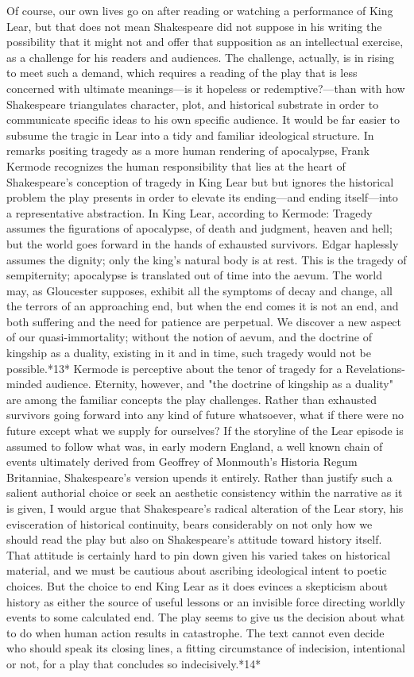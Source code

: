 	Of course, our own lives go on after reading or watching a performance of King Lear, but that does not mean Shakespeare did not suppose in his writing the possibility that it might not and offer that supposition as an intellectual exercise, as a challenge for his readers and audiences. The challenge, actually, is in rising to meet such a demand, which requires a reading of the play that is less concerned with ultimate meanings—is it hopeless or redemptive?—than with how Shakespeare triangulates character, plot, and historical substrate in order to communicate specific ideas to his own specific audience. It would be far easier to subsume the tragic in Lear into a tidy and familiar ideological structure. In remarks positing tragedy as a more human rendering of apocalypse, Frank Kermode recognizes the human responsibility that lies at the heart of Shakespeare's conception of tragedy in King Lear but but ignores the historical problem the play presents in order to elevate its ending—and ending itself—into a representative abstraction. In King Lear, according to Kermode:
Tragedy assumes the figurations of apocalypse, of death and judgment, heaven and hell; but the world goes forward in the hands of exhausted survivors. Edgar haplessly assumes the dignity; only the king's natural body is at rest. This is the tragedy of sempiternity; apocalypse is translated out of time into the aevum. The world may, as Gloucester supposes, exhibit all the symptoms of decay and change, all the terrors of an approaching end, but when the end comes it is not an end, and both suffering and the need for patience are perpetual. We discover a new aspect of our quasi-immortality; without the notion of aevum, and the doctrine of kingship as a duality, existing in it and in time, such tragedy would not be possible.*13*
Kermode is perceptive about the tenor of tragedy for a Revelations-minded audience. Eternity, however, and "the doctrine of kingship as a duality" are among the familiar concepts the play challenges. Rather than exhausted survivors going forward into any kind of future whatsoever, what if there were no future except what we supply for ourselves? If the storyline of the Lear episode is assumed to follow what was, in early modern England, a well known chain of events ultimately derived from Geoffrey of Monmouth's Historia Regum Britanniae, Shakespeare's version upends it entirely. Rather than justify such a salient authorial choice or seek an aesthetic consistency within the narrative as it is given, I would argue that Shakespeare's radical alteration of the Lear story, his evisceration of historical continuity, bears considerably on not only how we should read the play but also on Shakespeare's attitude toward history itself. That attitude is certainly hard to pin down given his varied takes on historical material, and we must be cautious about ascribing ideological intent to poetic choices. But the choice to end King Lear as it does evinces a skepticism about history as either the source of useful lessons or an invisible force directing worldly events to some calculated end. The play seems to give us the decision about what to do when human action results in catastrophe. The text cannot even decide who should speak its closing lines, a fitting circumstance of indecision, intentional or not, for a play that concludes so indecisively.*14*
